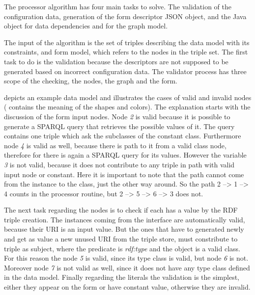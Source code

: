 The processor algorithm has four main tasks to solve. The validation of the configuration data, generation of the form descriptor JSON object, and the Java object for data dependencies and for  the graph model. 




The input of the algorithm is the set of triples describing the data model with its constraints, and form model, which refers to the nodes in the triple set. The first task to do is the validation because the descriptors are not supposed to be generated based on incorrect configuration data. The validator process has three scope of the checking, the nodes, the graph and the form.
 
 depicts an example data model and illustrates the cases of valid and invalid nodes ( contains the meaning of the shapes and colors). The explanation starts with the discussion of the form input nodes. Node \textit{2} is valid because it is possible to generate a SPARQL query that retrieves the possible values of it. The query contains one triple which ask the subclasses of the constant class. Furthermore node \textit{4} is valid as well, because there is path to it from a valid class node, therefore for there is again a SPARQL query for its values. However the variable \textit{3} is not valid, because it does not contribute to any triple in path with valid input node or constant. Here it is important to note that the path cannot come from the instance to the class, just the other way around. So the path 2 --> 1 --> 4 counts in the processor routine, but 2 --> 5 --> 6 --> 3 does not.
  


The next task regarding the nodes is to check if each has a value by the RDF triple creation. The instances coming from the interface are automatically valid, because their URI is an input value. But the ones that have to generated newly and get as value a new unused URI from the triple store, must constribute to triple as subject, where the predicate is \textit{rdf:type} and the object is a valid class. For this reason the node \textit{5} is valid, since its type class is valid, but node \textit{6} is not. Moreover node \textit{7} is not valid as well, since it does not have any type class defined in the data model. Finally regarding the literals the validation is the simplest, either they appear on the form or have constant value, otherwise they are invalid. 


